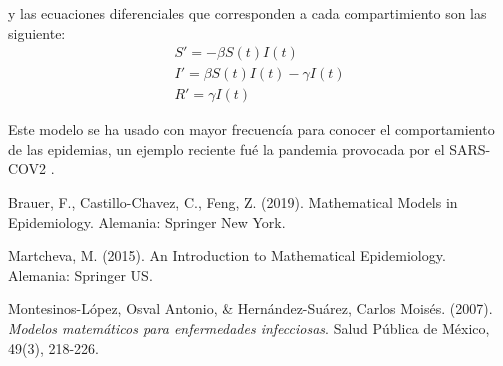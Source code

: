 \documentclass[a4paper,openany,12pt]{book}
\begin{document}
y las ecuaciones diferenciales que corresponden a cada compartimiento son las siguiente: 
\begin{align}
S' = -\beta S\left(t\right)I\left(t\right)\\			
I' = \beta S\left(t\right)I\left(t\right) - \gamma I\left(t\right)\\		
R' = \gamma I\left(t\right)
\end{align}

Este modelo se ha usado con mayor frecuencía para conocer el comportamiento de las epidemias, un ejemplo reciente fué la pandemia provocada por el SARS-COV2 \cite{Martcheva}.

\begin{thebibliography}{3}

Brauer, F., Castillo-Chavez, C., Feng, Z. (2019). Mathematical Models in Epidemiology. Alemania: Springer New York.

Martcheva, M. (2015). An Introduction to Mathematical Epidemiology. Alemania: Springer US.

Montesinos-López, Osval Antonio, \& Hernández-Suárez, Carlos Moisés. (2007). \textit{Modelos matemáticos para enfermedades infecciosas}. Salud Pública de México, 49(3), 218-226.

\end{thebibliography}
\end{document}
